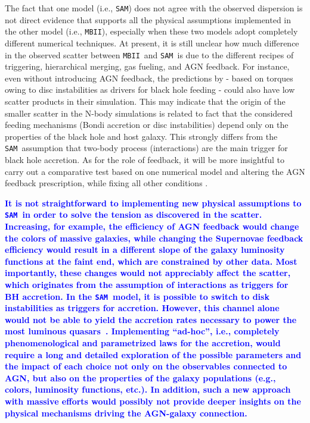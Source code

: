\documentclass[twocolumn,trackchanges]{aastex63}
\newcommand{\sam}{\texttt{SAM}}
\newcommand{\mbii}{\texttt{MBII}}
\newcommand{\blue}[1]{{\textcolor{blue}{\bf #1}}}
\begin{document}
The fact that one model (i.e., \sam) does not agree with the observed dispersion is not direct evidence that supports all the physical assumptions implemented in the other model (i.e., \mbii), especially when these two models adopt completely different numerical techniques. At present, it is still unclear how much difference in the observed scatter between \mbii\ and \sam\ is due to the different recipes of triggering, hierarchical merging, gas fueling, and AGN feedback. For instance, even without introducing AGN feedback, the predictions by \citet{2017MNRAS.464.2840A} - based on torques owing to disc instabilities as 
 drivers for black hole feeding - could also have low scatter products in their simulation.
This may indicate that the origin of the smaller scatter in the N-body simulations is related to fact that the considered feeding mechanisms (Bondi accretion or disc instabilities) depend only on the properties of the black hole and host galaxy. 
This strongly differs from the \sam\ assumption that two-body process (interactions) are the main trigger for black hole accretion. 
As for the role of feedback, it will be more insightful to carry out a comparative test based on one numerical model and altering the AGN feedback prescription, while fixing all other conditions \citep[see][]{Hopkins2009}.

\blue{It is not straightforward to implementing new physical assumptions to \sam\  in order to solve the tension as discovered in the scatter. 
Increasing, for example, the efficiency of AGN feedback would change the colors of massive galaxies, while changing the Supernovae feedback efficiency would result in a different slope of the galaxy luminosity functions at the faint end, which are constrained by other data. Most importantly, these changes would not appreciably affect the scatter, which originates from the assumption of interactions as triggers for BH accretion. In the \sam\ model, it is possible to switch to disk instabilities as triggers for accretion. However, this channel alone would not be able to yield the accretion rates necessary to power the most luminous quasars~\citep[see][]{Menci2014}. Implementing ``ad-hoc'', i.e., completely phenomenological and parametrized laws for the accretion, would require a long and detailed exploration of the possible parameters and the impact of each choice not only on the observables connected to AGN, but also on the properties of the galaxy populations (e.g., colors, luminosity functions, etc.). In addition, such a new approach with massive efforts would possibly not provide deeper insights on the physical mechanisms driving the AGN-galaxy connection.}
\end{document}
